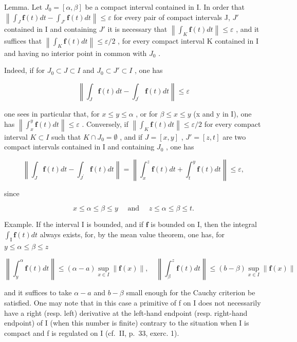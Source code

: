 Lemma. Let \(J_{0} = [\alpha, \beta]\) be a compact interval contained in I. In order that \(\left\|\int_{J} \mathbf{f}(t) dt - \int_{J'} \mathbf{f}(t) dt\right\| \leqslant \varepsilon\) for every pair of compact intervals J, \(J'\) contained in I and containing \(J'\) it is necessary that \(\left\|\int_{K} \mathbf{f}(t) dt\right\| \leqslant \varepsilon\) , and it suffices that \(\left\|\int_{K} \mathbf{f}(t) dt\right\| \leqslant \varepsilon/2\) , for every compact interval K contained in I and having no interior point in common with \(J_{0}\) .

Indeed, if for \(J_{0} \subset J \subset I\) and \(J_{0} \subset J' \subset I\) , one has

\[
\left\| \int_ {J} \mathbf {f} (t) d t - \int_ {J ^ {\prime}} \mathbf {f} (t) d t \right\| \leqslant \varepsilon
\]

one sees in particular that, for \(x \leqslant y \leqslant \alpha\) , or for \(\beta \leqslant x \leqslant y\) (x and y in I), one has \(\left\|\int_{x}^{y} \mathbf{f}(t) dt\right\| \leqslant \varepsilon\) . Conversely, if \(\left\|\int_{K} \mathbf{f}(t) dt\right\| \leqslant \varepsilon/2\) for every compact interval \(K \subset I\) such that \(K \cap J_{0} = \emptyset\) , and if \(J = [x, y]\) , \(J' = [z, t]\) are two compact intervals contained in I and containing \(J_{0}\) , one has

\[
\left\| \int_ {J} \mathbf {f} (t) d t - \int_ {J ^ {\prime}} \mathbf {f} (t) d t \right\| = \left\| \int_ {x} ^ {z} \mathbf {f} (t) d t + \int_ {t} ^ {y} \mathbf {f} (t) d t \right\| \leqslant \varepsilon ,
\]

since

\[
x \leqslant \alpha \leqslant \beta \leqslant y \quad \text { and } \quad z \leqslant \alpha \leqslant \beta \leqslant t.
\]

Example. If the interval I is bounded, and if \(\mathbf{f}\) is bounded on I, then the integral \(\int_{\mathrm{I}}\mathbf{f}(t)dt\) always exists, for, by the mean value theorem, one has, for \(y\leqslant \alpha \leqslant \beta \leqslant z\)

\[
\left\| \int_ {y} ^ {\alpha} \mathbf {f} (t) d t \right\| \leqslant (\alpha - a) \sup _ {x \in I} \| \mathbf {f} (x) \|, \quad \left\| \int_ {\beta} ^ {z} \mathbf {f} (t) d t \right\| \leqslant (b - \beta) \sup _ {x \in I} \| \mathbf {f} (x) \|
\]

and it suffices to take \(\alpha - a\) and \(b - \beta\) small enough for the Cauchy criterion be satisfied. One may note that in this case a primitive of f on I does not necessarily have a right (resp. left) derivative at the left-hand endpoint (resp. right-hand endpoint) of I (when this number is finite) contrary to the situation when I is compact and f is regulated on I (cf.~II, p.~33, exerc. 1).

